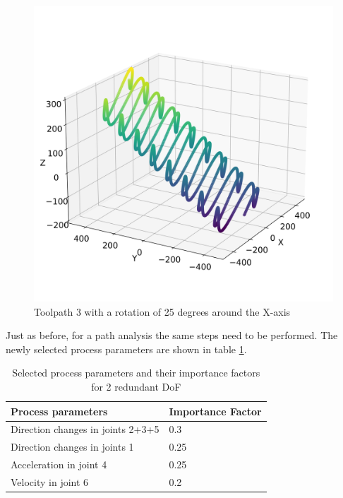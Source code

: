 \begin{figure}[H]
\begin{minipage}{0.5\textwidth}
		\includegraphics[width=\textwidth]{figures/path3_kipp_25.png}
		\caption{Toolpath 3 with a rotation of 25 degrees around the X-axis}
		\label{TP3_25}
	\end{minipage}\par
\end{figure}
 

Just as before, for a path analysis the same steps need to be performed. The newly selected process parameters are shown in table \ref{PP_2}.
\begin{table}[H]
	\centering
	\begin{tabular}{||l|l||}
		Process parameters& Importance Factor \\
		\hline
		\hline
		\hline
		Direction changes in joints 2+3+5	&		0.3 \\
		Direction changes in joints 1	&  	0.25 \\
		Acceleration in joint 4	& 		0.25\\
		Velocity in joint 6	& 		0.2\\
		\hline
		\hline
	\end{tabular}
	
	\caption{Selected process parameters and their importance factors for 2 redundant DoF}
	\label{PP_2}
\end{table}


